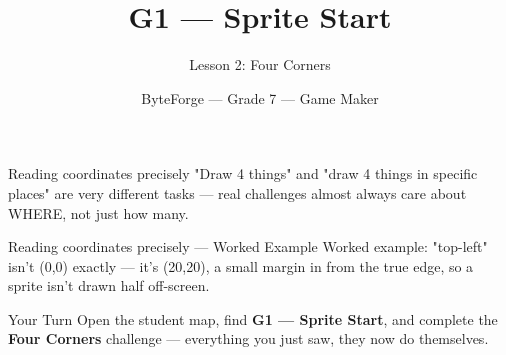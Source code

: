 \documentclass[aspectratio=169]{beamer}
\title{G1 — Sprite Start}
\subtitle{Lesson 2: Four Corners}
\author{ByteForge --- Grade 7 --- Game Maker}
\date{}
\begin{document}
\begin{frame}
    \titlepage
\end{frame}

\begin{frame}{Reading coordinates precisely}
    \Large
    "Draw 4 things" and "draw 4 things in specific places" are very different tasks — real challenges almost always care about WHERE, not just how many.

    \begin{center}
    \end{center}
\end{frame}

\begin{frame}{Reading coordinates precisely --- Worked Example}
    \Large
    Worked example: "top-left" isn't (0,0) exactly — it's (20,20), a small margin in from the true edge, so a sprite isn't drawn half off-screen.
\end{frame}

\begin{frame}{Your Turn}
    \Large
    Open the student map, find \textbf{G1 — Sprite Start}, and complete
    the \textbf{Four Corners} challenge --- everything you just saw, they now do themselves.
\end{frame}
\end{document}
